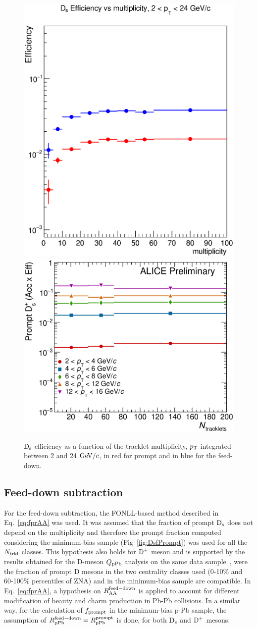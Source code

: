 \begin{figure}[h]
\centering
 \includegraphics[width=.45\textwidth]{FigCap6/DsEffvsMult_pPb2016.eps}
 \includegraphics[width=.45\textwidth]{FigCap6/PromptDsEfficiency_times_Acceptance_VsNtrkl.eps}
 \caption{${\rm D_s}$ efficiency as a function of the tracklet multiplicity, $p_{\rm T}$-integrated between 2 and 24 $\mathrm{GeV}/c$, in red for prompt and in blue for the feed-down.}
 \label{fig:DsEffVsMult}
\end{figure}



\subsection {Feed-down subtraction}
For the feed-down subtraction, the FONLL-based method 
described in Eq.~\ref{eq:fprAA} was used. It was 
assumed that the fraction of prompt ${\rm D_s}$ does not depend on the 
multiplicity and therefore the prompt fraction computed considering 
the minimum-bias sample (Fig~\ref{fig:DsfPrompt}) was used for all the $N_{\rm trkl}$ classes. 
This hypothesis also holds for ${\rm D^+}$ meson and is supported 
by the results obtained for the D-meson $Q_{\rm pPb}$ analysis on the same data sample~\cite{ALICEPAS2017008}, 
were the fraction of prompt D mesons in the two centrality classes used (0-10\% and 60-100\%
percentiles of ZNA) and in the minimum-bias sample are compatible. 
In Eq.~\ref{eq:fprAA}, a hypothesis on $R_{\rm AA}^{\rm feed-down}$
is applied to account for different modification of beauty and charm 
production in Pb-Pb collisions. In a similar way, for the calculation of $f_{\rm prompt}$ in 
the minimum-bias p-Pb sample, the assumption of $R_{\rm pPb}^{\rm feed-down} = R_{\rm pPb}^{\rm prompt}$ 
is done, for both ${\rm D_s}$ and ${\rm D^+}$ mesons.

